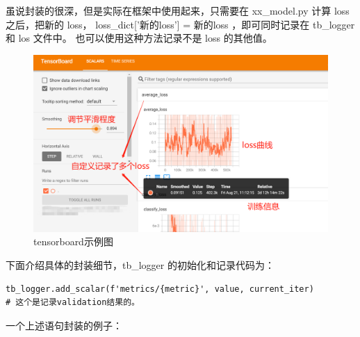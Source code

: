 \documentclass[../main.tex]{subfiles}
\begin{document}
\begin{hl} %
虽说封装的很深，但是实际在框架中使用起来，只需要在 xx\_model.py 计算 loss 之后，把新的 loss， loss\_dict['新的loss'] = 新的loss ，即可同时记录在 tb\_logger 和 los 文件中。
也可以使用这种方法记录不是 loss 的其他值。
\end{hl}

\begin{figure}[h]
    \begin{center}
        \includegraphics[width=0.8\linewidth]{figures/tensorboard_demo.png}
        \caption{tensorboard示例图}
        \label{fig:tensorboard_demo}
    \end{center}
\end{figure}

下面介绍具体的封装细节，tb\_logger 的初始化和记录代码为：

\begin{verbatim}
tb_logger.add_scalar(f'metrics/{metric}', value, current_iter)
# 这个是记录validation结果的。
\end{verbatim}

一个上述语句封装的例子：
\end{document}
